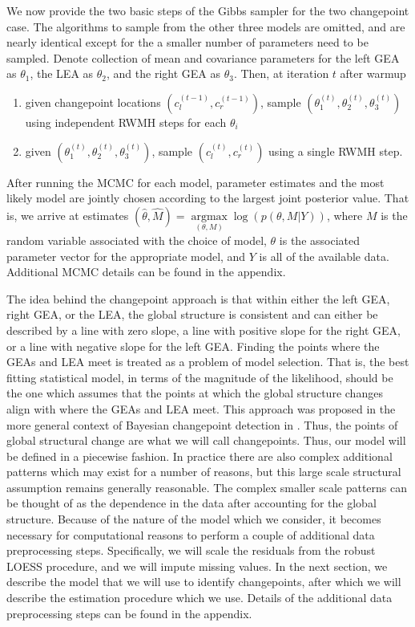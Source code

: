 \documentclass[12pt]{article}
\providecommand{\tightlist}{%
  \setlength{\itemsep}{0pt}\setlength{\parskip}{0pt}}
\begin{document}
We now provide the two basic steps of the Gibbs sampler for the two
changepoint case. The algorithms to sample from the other three models
are omitted, and are nearly identical except for the a smaller number of
parameters need to be sampled. Denote collection of mean and covariance
parameters for the left GEA as \(\theta_1\), the LEA as \(\theta_2\),
and the right GEA as \(\theta_3\). Then, at iteration \(t\) after warmup

\begin{enumerate}
\def\labelenumi{\arabic{enumi}.}
\tightlist
\item
  given changepoint locations \((c_l^{(t - 1)}, c_r^{(t - 1)})\), sample
  \((\theta_1^{(t)}, \theta_2^{(t)}, \theta_3^{(t)})\) using independent
  RWMH steps for each \(\theta_i\)
\item
  given \((\theta_1^{(t)}, \theta_2^{(t)}, \theta_3^{(t)})\), sample
  \((c_l^{(t)}, c_r^{(t)})\) using a single RWMH step.
\end{enumerate}

After running the MCMC for each model, parameter estimates and the most
likely model are jointly chosen according to the largest joint posterior
value. That is, we arrive at estimates
\((\hat{\theta}, \hat{M}) = \underset{(\theta, M)}{\operatorname{argmax}}{\log(p(\theta, M | Y))}\),
where \(M\) is the random variable associated with the choice of model,
\(\theta\) is the associated parameter vector for the appropriate model,
and \(Y\) is all of the available data. Additional MCMC details can be
found in the appendix.

The idea behind the changepoint approach is that within either the left
GEA, right GEA, or the LEA, the global structure is consistent and can
either be described by a line with zero slope, a line with positive
slope for the right GEA, or a line with negative slope for the left GEA.
Finding the points where the GEAs and LEA meet is treated as a problem
of model selection. That is, the best fitting statistical model, in
terms of the magnitude of the likelihood, should be the one which
assumes that the points at which the global structure changes align with
where the GEAs and LEA meet. This approach was proposed in the more
general context of Bayesian changepoint detection in
\citet{stephens1994}. Thus, the points of global structural change are
what we will call changepoints. Thus, our model will be defined in a
piecewise fashion. In practice there are also complex additional
patterns which may exist for a number of reasons, but this large scale
structural assumption remains generally reasonable. The complex smaller
scale patterns can be thought of as the dependence in the data after
accounting for the global structure. Because of the nature of the model
which we consider, it becomes necessary for computational reasons to
perform a couple of additional data preprocessing steps. Specifically,
we will scale the residuals from the robust LOESS procedure, and we will
impute missing values. In the next section, we describe the model that
we will use to identify changepoints, after which we will describe the
estimation procedure which we use. Details of the additional data
preprocessing steps can be found in the appendix.
\end{document}
